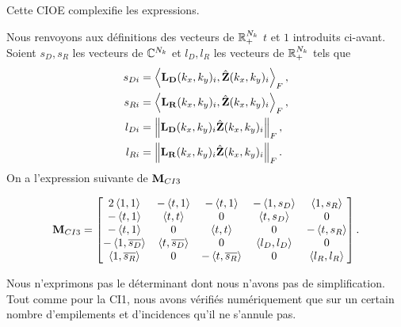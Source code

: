         Cette CIOE complexifie les expressions.


        Nous renvoyons aux définitions des vecteurs de \(\mathbb R_+^{N_{k}}\) \(t\) et \(1\) introduits ci-avant.
        Soient \(s_D,s_R\) les vecteurs de \(\mathbb C^{N_{k}}\) et \(l_D,l_R\) les vecteurs de \(\mathbb R_+^{N_{k}}\) tels que
        \begin{align*}
          s_{Di} &= \left<{\mathbf{L_D}(k_{x},k_{y})_i},{\hat{\mathbf{Z}}(k_{x},k_{y})_i}\right>_F,
          \\
          s_{Ri} &= \left<{\mathbf{L_R}(k_{x},k_{y})_i},{\hat{\mathbf{Z}}(k_{x},k_{y})_i}\right>_F,
          \\
          l_{Di} &= \left\lVert\mathbf{L_D}(k_{x},k_{y})_i\hat{\mathbf{Z}}(k_{x},k_{y})_i\right\rVert_F,
          \\
          l_{Ri} &= \left\lVert\mathbf{L_R}(k_{x},k_{y})_i\hat{\mathbf{Z}}(k_{x},k_{y})_i\right\rVert_F.
        \end{align*}
        On a l'expression suivante de \({\mathbf{M}_{CI3}}\)

        \begin{equation*}
          {\mathbf{M}}_{CI3} = \begin{bmatrix}
          2\left<{1},{1}\right>          & -\left<{t},{1}\right>          & -\left<{t},{1}\right>           & -\left<{1},{s_D}\right>   & \left<{1},{s_R}\right>
          \\
          -\left<{t},{1}\right>          & \left<{t},{t}\right>           & 0                    & \left<{t},{s_D}\right>    & 0
          \\
          -\left<{t},{1}\right>          & 0                   & \left<{t},{t}\right>            & 0              & - \left<{t},{s_R}\right>
          \\
          -\left<{1},{{\overline{s_D}}}\right> & \left<{t},{{\overline{s_D}}}\right>  & 0                    & \left<{l_D},{l_D}\right>  & 0
          \\
          \left<{1},{{\overline{s_R}}}\right>  & 0                   & -\left<{t},{{\overline{s_R}}}\right>  & 0              & \left<{l_R},{l_R}\right>
          \end{bmatrix}.
        \end{equation*}
        
        Nous n'exprimons pas le déterminant dont nous n'avons pas de simplification.
        Tout comme pour la CI1, nous avons vérifiés numériquement que sur un certain nombre d'empilements et d’incidences qu'il ne s'annule pas.


